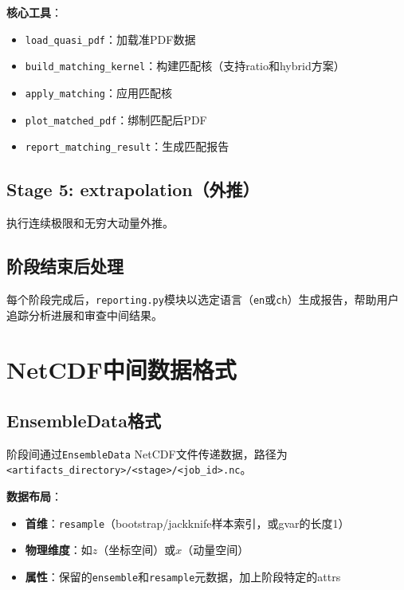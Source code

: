 \documentclass[12pt,a4paper]{ctexart}
\begin{document}
\textbf{核心工具}：
\begin{itemize}[leftmargin=*]
    \item \texttt{load\_quasi\_pdf}：加载准PDF数据
    \item \texttt{build\_matching\_kernel}：构建匹配核（支持ratio和hybrid方案）
    \item \texttt{apply\_matching}：应用匹配核
    \item \texttt{plot\_matched\_pdf}：绑制匹配后PDF
    \item \texttt{report\_matching\_result}：生成匹配报告
\end{itemize}

\subsection{Stage 5: extrapolation（外推）}

执行连续极限和无穷大动量外推。

\subsection{阶段结束后处理}

每个阶段完成后，\texttt{reporting.py}模块以选定语言（\texttt{en}或\texttt{ch}）生成报告，帮助用户追踪分析进展和审查中间结果。

\section{NetCDF中间数据格式}

\subsection{EnsembleData格式}

阶段间通过\texttt{EnsembleData} NetCDF文件传递数据，路径为\texttt{<artifacts\_directory>/<stage>/<job\_id>.nc}。

\textbf{数据布局}：
\begin{itemize}[leftmargin=*]
    \item \textbf{首维}：\texttt{resample}（bootstrap/jackknife样本索引，或gvar的长度1）
    \item \textbf{物理维度}：如$z$（坐标空间）或$x$（动量空间）
    \item \textbf{属性}：保留的\texttt{ensemble}和\texttt{resample}元数据，加上阶段特定的attrs
\end{itemize}
\end{document}
